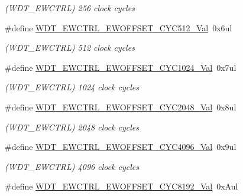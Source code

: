\begin{DoxyCompactItemize}
\begin{DoxyCompactList}\small\item\em (W\+D\+T\+\_\+\+E\+W\+C\+T\+R\+L) 256 clock cycles \end{DoxyCompactList}\item 
\hypertarget{group___s_a_m_l21___w_d_t_ga9de5c16a1592d6967a3fbf429af4ce75}{}\#define \hyperlink{group___s_a_m_l21___w_d_t_ga9de5c16a1592d6967a3fbf429af4ce75}{W\+D\+T\+\_\+\+E\+W\+C\+T\+R\+L\+\_\+\+E\+W\+O\+F\+F\+S\+E\+T\+\_\+\+C\+Y\+C512\+\_\+\+Val}~0x6ul\label{group___s_a_m_l21___w_d_t_ga9de5c16a1592d6967a3fbf429af4ce75}

\begin{DoxyCompactList}\small\item\em (W\+D\+T\+\_\+\+E\+W\+C\+T\+R\+L) 512 clock cycles \end{DoxyCompactList}\item 
\hypertarget{group___s_a_m_l21___w_d_t_ga3367bd5665970adb6317162a90160774}{}\#define \hyperlink{group___s_a_m_l21___w_d_t_ga3367bd5665970adb6317162a90160774}{W\+D\+T\+\_\+\+E\+W\+C\+T\+R\+L\+\_\+\+E\+W\+O\+F\+F\+S\+E\+T\+\_\+\+C\+Y\+C1024\+\_\+\+Val}~0x7ul\label{group___s_a_m_l21___w_d_t_ga3367bd5665970adb6317162a90160774}

\begin{DoxyCompactList}\small\item\em (W\+D\+T\+\_\+\+E\+W\+C\+T\+R\+L) 1024 clock cycles \end{DoxyCompactList}\item 
\hypertarget{group___s_a_m_l21___w_d_t_gab0f7be4f8e1b1fca28f6aa34ffd55b20}{}\#define \hyperlink{group___s_a_m_l21___w_d_t_gab0f7be4f8e1b1fca28f6aa34ffd55b20}{W\+D\+T\+\_\+\+E\+W\+C\+T\+R\+L\+\_\+\+E\+W\+O\+F\+F\+S\+E\+T\+\_\+\+C\+Y\+C2048\+\_\+\+Val}~0x8ul\label{group___s_a_m_l21___w_d_t_gab0f7be4f8e1b1fca28f6aa34ffd55b20}

\begin{DoxyCompactList}\small\item\em (W\+D\+T\+\_\+\+E\+W\+C\+T\+R\+L) 2048 clock cycles \end{DoxyCompactList}\item 
\hypertarget{group___s_a_m_l21___w_d_t_ga594b6b1082b7066707ca8b1913fa22b1}{}\#define \hyperlink{group___s_a_m_l21___w_d_t_ga594b6b1082b7066707ca8b1913fa22b1}{W\+D\+T\+\_\+\+E\+W\+C\+T\+R\+L\+\_\+\+E\+W\+O\+F\+F\+S\+E\+T\+\_\+\+C\+Y\+C4096\+\_\+\+Val}~0x9ul\label{group___s_a_m_l21___w_d_t_ga594b6b1082b7066707ca8b1913fa22b1}

\begin{DoxyCompactList}\small\item\em (W\+D\+T\+\_\+\+E\+W\+C\+T\+R\+L) 4096 clock cycles \end{DoxyCompactList}\item 
\hypertarget{group___s_a_m_l21___w_d_t_gabe331c5db344d09c5081b32d7bc4f030}{}\#define \hyperlink{group___s_a_m_l21___w_d_t_gabe331c5db344d09c5081b32d7bc4f030}{W\+D\+T\+\_\+\+E\+W\+C\+T\+R\+L\+\_\+\+E\+W\+O\+F\+F\+S\+E\+T\+\_\+\+C\+Y\+C8192\+\_\+\+Val}~0x\+Aul\label{group___s_a_m_l21___w_d_t_gabe331c5db344d09c5081b32d7bc4f030}


\end{DoxyCompactItemize}

